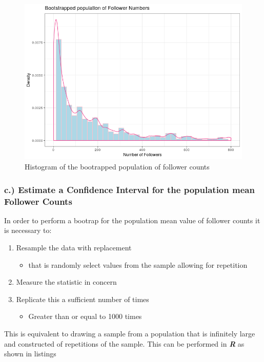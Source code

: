 \documentclass[11pt]{article}
\begin{document}
\begin{figure}[htbp]
\centering
\includegraphics[width=12cm]{./Figures/BootStrap_Pop.png}
\caption{\label{fig:org2def6d4}Histogram of the bootrapped population of follower counts}
\end{figure}

\subsubsection{c.) Estimate a Confidence Interval for the population mean Follower Counts}
\label{sec:orga8a3729}
In order to perform a bootrap for the population mean value of follower counts it is necessary to:

\begin{enumerate}
\item Resample the data with replacement
\begin{itemize}
\item that is randomly select values from the sample allowing for repetition
\end{itemize}
\item Measure the statistic in concern
\item Replicate this a sufficient number of times
\begin{itemize}
\item Greater than or equal to 1000 times \cite[Ch. 5]{davison1997}
\end{itemize}
\end{enumerate}

This is equivalent to drawing a sample from a population that is infinitely large and constructed of repetitions of the sample. This can be performed in \textbf{\emph{R}} as shown in listings
\end{document}
